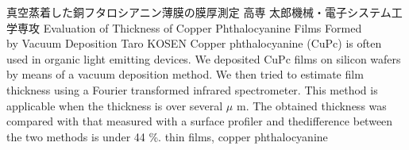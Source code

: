 

\titleAndAbstractAndKeywords
{真空蒸着した銅フタロシアニン薄膜の膜厚測定}
{高専 太郎}{機械・電子システム工学専攻}
{Evaluation of Thickness of Copper Phthalocyanine Films Formed \\ by Vacuum Deposition}
{Taro KOSEN}
{
Copper phthalocyanine (CuPc) is often used in organic light emitting devices.
We deposited CuPc films on silicon wafers by means of a vacuum deposition method.
We then tried to estimate film thickness using a Fourier transformed infrared spectrometer.
This method is applicable when the thickness is over several $\mu$ m.
The obtained thickness was compared with that measured with a surface profiler and thedifference between the two methods is under 44 \%.
}
{thin films, copper phthalocyanine}
